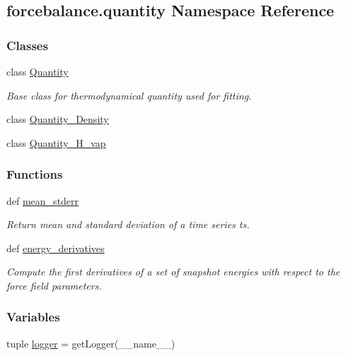 \hypertarget{namespaceforcebalance_1_1quantity}{\subsection{forcebalance.\-quantity Namespace Reference}
\label{namespaceforcebalance_1_1quantity}
}
\subsubsection*{Classes}
\begin{DoxyCompactItemize}
\item 
class \hyperlink{classforcebalance_1_1quantity_1_1Quantity}{Quantity}
\begin{DoxyCompactList}\small\item\em Base class for thermodynamical quantity used for fitting. \end{DoxyCompactList}\item 
class \hyperlink{classforcebalance_1_1quantity_1_1Quantity__Density}{Quantity\-\_\-\-Density}
\item 
class \hyperlink{classforcebalance_1_1quantity_1_1Quantity__H__vap}{Quantity\-\_\-\-H\-\_\-vap}
\end{DoxyCompactItemize}
\subsubsection*{Functions}
\begin{DoxyCompactItemize}
\item 
def \hyperlink{namespaceforcebalance_1_1quantity_a22d7b6184a255d4053ed1b6936e576f3}{mean\-\_\-stderr}
\begin{DoxyCompactList}\small\item\em Return mean and standard deviation of a time series ts. \end{DoxyCompactList}\item 
def \hyperlink{namespaceforcebalance_1_1quantity_a7968a8de12ab0744963598c488f91a4d}{energy\-\_\-derivatives}
\begin{DoxyCompactList}\small\item\em Compute the first derivatives of a set of snapshot energies with respect to the force field parameters. \end{DoxyCompactList}\end{DoxyCompactItemize}
\subsubsection*{Variables}
\begin{DoxyCompactItemize}
\item 
tuple \hyperlink{namespaceforcebalance_1_1quantity_a1d4f48df65583ff66457beb51ef5c361}{logger} = get\-Logger(\-\_\-\-\_\-name\-\_\-\-\_\-)
\end{DoxyCompactItemize}


